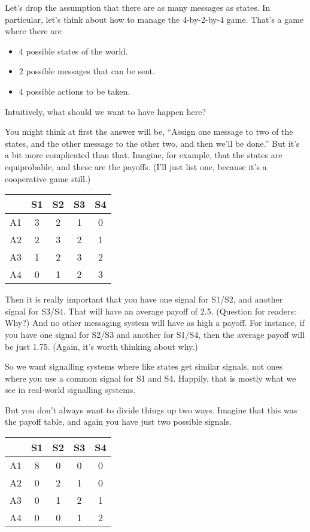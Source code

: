 \documentclass[11pt,]{article}
\providecommand{\tightlist}{%
  \setlength{\itemsep}{0pt}\setlength{\parskip}{0pt}}
\begin{document}
Let's drop the assumption that there are as many messages as states. In
particular, let's think about how to manage the 4-by-2-by-4 game. That's
a game where there are

\begin{itemize}
\tightlist
\item
  4 possible states of the world.
\item
  2 possible messages that can be sent.
\item
  4 possible actions to be taken.
\end{itemize}

Intuitively, what should we want to have happen here?

You might think at first the answer will be, ``Assign one message to two
of the states, and the other message to the other two, and then we'll be
done.'' But it's a bit more complicated than that. Imagine, for example,
that the states are equiprobable, and these are the payoffs. (I'll just
list one, because it's a cooperative game still.)

\begin{longtable}[]{@{}ccccc@{}}
\toprule
& S1 & S2 & S3 & S4\tabularnewline
\midrule
\endhead
A1 & 3 & 2 & 1 & 0\tabularnewline
A2 & 2 & 3 & 2 & 1\tabularnewline
A3 & 1 & 2 & 3 & 2\tabularnewline
A4 & 0 & 1 & 2 & 3\tabularnewline
\bottomrule
\end{longtable}

Then it is really important that you have one signal for S1/S2, and
another signal for S3/S4. That will have an average payoff of 2.5.
(Question for readers: Why?) And no other messaging system will have as
high a payoff. For instance, if you have one signal for S2/S3 and
another for S1/S4, then the average payoff will be just 1.75. (Again,
it's worth thinking about why.)

So we want signalling systems where like states get similar signals, not
ones where you use a common signal for S1 and S4. Happily, that is
mostly what we see in real-world signalling systems.

But you don't always want to divide things up two ways. Imagine that
this was the payoff table, and again you have just two possible signals.

\begin{longtable}[]{@{}ccccc@{}}
\toprule
& S1 & S2 & S3 & S4\tabularnewline
\midrule
\endhead
A1 & 8 & 0 & 0 & 0\tabularnewline
A2 & 0 & 2 & 1 & 0\tabularnewline
A3 & 0 & 1 & 2 & 1\tabularnewline
A4 & 0 & 0 & 1 & 2\tabularnewline
\bottomrule
\end{longtable}
\end{document}
